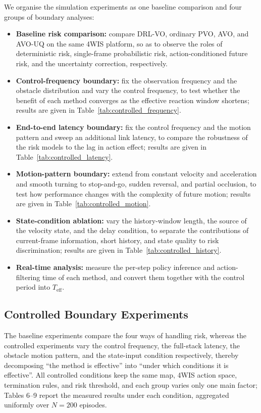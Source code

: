 \documentclass[10pt,a4paper,twocolumn]{article}
\begin{document}
We organise the simulation experiments as one baseline comparison and four groups of boundary analyses:
\begin{itemize}
    \item \textbf{Baseline risk comparison:} compare DRL-VO, ordinary PVO, AVO, and AVO-UQ on the same 4WIS platform, so as to observe the roles of deterministic risk, single-frame probabilistic risk, action-conditioned future risk, and the uncertainty correction, respectively.
    \item \textbf{Control-frequency boundary:} fix the observation frequency and the obstacle distribution and vary the control frequency, to test whether the benefit of each method converges as the effective reaction window shortens; results are given in Table~\ref{tab:controlled_frequency}.
    \item \textbf{End-to-end latency boundary:} fix the control frequency and the motion pattern and sweep an additional link latency, to compare the robustness of the risk models to the lag in action effect; results are given in Table~\ref{tab:controlled_latency}.
    \item \textbf{Motion-pattern boundary:} extend from constant velocity and acceleration and smooth turning to stop-and-go, sudden reversal, and partial occlusion, to test how performance changes with the complexity of future motion; results are given in Table~\ref{tab:controlled_motion}.
    \item \textbf{State-condition ablation:} vary the history-window length, the source of the velocity state, and the delay condition, to separate the contributions of current-frame information, short history, and state quality to risk discrimination; results are given in Table~\ref{tab:controlled_history}.
    \item \textbf{Real-time analysis:} measure the per-step policy inference and action-filtering time of each method, and convert them together with the control period into $T_{\mathrm{eff}}$.
\end{itemize}

\subsection{Controlled Boundary Experiments}

The baseline experiments compare the four ways of handling risk, whereas the controlled experiments vary the control frequency, the full-stack latency, the obstacle motion pattern, and the state-input condition respectively, thereby decomposing ``the method is effective'' into ``under which conditions it is effective''. All controlled conditions keep the same map, 4WIS action space, termination rules, and risk threshold, and each group varies only one main factor; Tables 6--9 report the measured results under each condition, aggregated uniformly over $N=200$ episodes.
\end{document}

